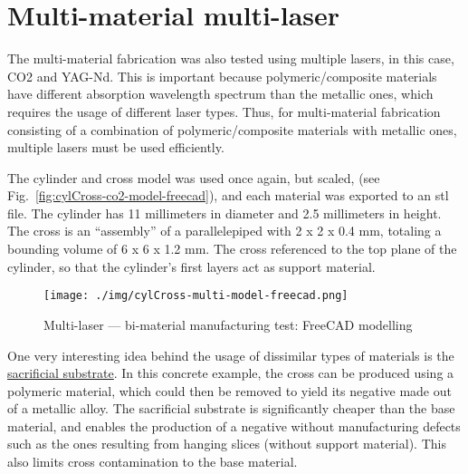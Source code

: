 \section{Multi-material multi-laser}%
\label{sec:multi-material-multi}
The multi-material fabrication was also tested using multiple lasers, in this
case, CO2 and YAG-Nd. This is important because polymeric/composite materials
have different absorption wavelength spectrum than the metallic ones, which requires the
usage of different laser types.
Thus, for multi-material fabrication consisting
of a combination of polymeric/composite materials with metallic ones, multiple
lasers must be used efficiently.

The cylinder and cross model was used once again, but
scaled, (see Fig.~\ref{fig:cylCross-co2-model-freecad}), and each material was exported to an \gls{stl} file. The
cylinder has 11 millimeters in diameter and 2.5 millimeters in height. The cross
is an ``assembly'' of a parallelepiped with 2 x 2 x 0.4 mm, totaling a bounding
volume of 6 x 6 x 1.2 mm. The cross
referenced to the top plane of the cylinder, so that the cylinder's first layers
act as support material.

\begin{figure}[htbp!]
  \centering
  \texttt{[image: ./img/cylCross-multi-model-freecad.png]}
  \caption{Multi-laser --- bi-material manufacturing test: FreeCAD modelling}%
  \label{fig:cylCross-multi-model-freecad}
\end{figure}

One very interesting idea behind the usage of dissimilar types of materials is
the \underline{sacrificial substrate}. In this concrete example, the cross can be produced
using a polymeric material, which could then be removed to yield its negative
made out of a metallic alloy. The sacrificial substrate is significantly cheaper
than the base material, and enables the production of a negative without
manufacturing defects such as the ones resulting from hanging slices (without
support material). This also limits cross contamination to the base material.

